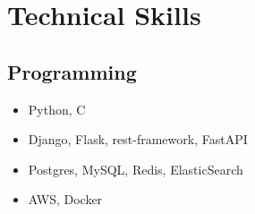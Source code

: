 
\section*{ Technical Skills}
\subsection*{Programming}
\begin{center}
  \begin{itemize}[label=, itemsep=-3pt]
      \item Python, C
      \item Django, Flask, rest-framework, FastAPI
      \item Postgres, MySQL, Redis, ElasticSearch
      \item AWS, Docker
  \end{itemize}
\end{center}

